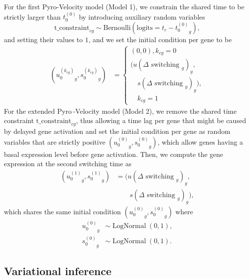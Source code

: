 \documentclass[
  sn-mathphys-num,
  lineno,
  twocolumn]{sn-jnl}
\begin{document}
For the first Pyro-Velocity model (Model 1), we constrain the shared
time to be strictly larger than \(t_{0}^{(0)}\) by introducing auxiliary
random variables \[
\text{t\_constraint}_{cg} 
  \sim \text{Bernoulli} \left( \text{logits} = t_c - {t_{0}^{(0)}}_g \right),
\] and setting their values to \(1\), and we set the initial condition
per gene to be \begin{align}
\left( {u_{0}^{(k_{cg})}}_g , {s_{0}^{(k_{cg})}}_g \right) &= \left\{
  \begin{array}{l}
    (0,0), k_{c g}=0 \\
    \bigg( {u \left( \Delta \text { switching }_g \right)}_g,\\
           \quad {s \left( \Delta \text { switching }_g \right)}_g \bigg), \\
           \quad k_{c g}=1
  \end{array}\right.
\end{align} For the extended Pyro -Velocity model (Model 2), we remove
the shared time constraint \(\text{t\_constraint}_{cg}\), thus allowing
a time lag per gene that might be caused by delayed gene activation and
set the initial condition per gene as random variables that are strictly
positive \(\left({u_{0}^{(0)}}_g,
{s_{0}^{(0)}}_g\right)\), which allow genes having a basal expression
level before gene activation. Then, we compute the gene expression at
the second switching time as \begin{align}
({u_{0}^{(1)}}_g, {s_{0}^{(1)}}_g) &= 
  \bigg( {u \left( \Delta \text { switching }_g \right)}_g, \nonumber \\
& \qquad {s \left( \Delta \text { switching }_g \right)}_g \bigg),
\end{align} which shares the same initial condition
\(\left({u_{0}^{(0)}}_g, {s_{0}^{(0)}}_g\right)\) where \begin{align}
{u_{0}^{(0)}}_g &\sim \operatorname{LogNormal}(0,1),\\
{s_{0}^{(0)}}_g &\sim \operatorname{LogNormal}(0,1).
\end{align}

\subsection{Variational inference}\label{sec-methods-inference}
\end{document}
